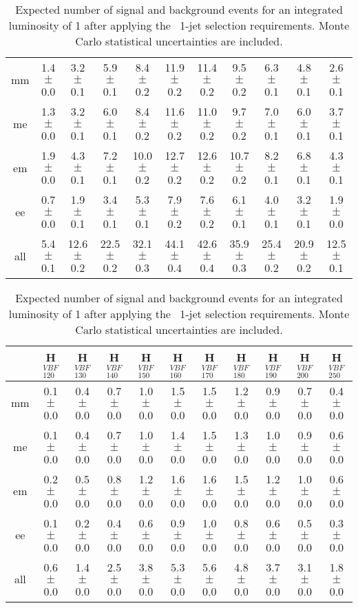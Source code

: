 \begin{table}[!ht]
\begin{center}
{\begin{tabular} {|c|c|c|c|c|c|c|c|c|c|c|}
  mm &  1.4$\pm$0.0 &  3.2$\pm$0.1 &  5.9$\pm$0.1 &  8.4$\pm$0.2 & 11.9$\pm$0.2 & 11.4$\pm$0.2 &  9.5$\pm$0.2 &  6.3$\pm$0.1 &  4.8$\pm$0.1 &  2.6$\pm$0.1 \\
  me &  1.3$\pm$0.0 &  3.2$\pm$0.1 &  6.0$\pm$0.1 &  8.4$\pm$0.2 & 11.6$\pm$0.2 & 11.0$\pm$0.2 &  9.7$\pm$0.2 &  7.0$\pm$0.1 &  6.0$\pm$0.1 &  3.7$\pm$0.1 \\
  em &  1.9$\pm$0.0 &  4.3$\pm$0.1 &  7.2$\pm$0.1 & 10.0$\pm$0.2 & 12.7$\pm$0.2 & 12.6$\pm$0.2 & 10.7$\pm$0.2 &  8.2$\pm$0.1 &  6.8$\pm$0.1 &  4.3$\pm$0.1 \\
  ee &  0.7$\pm$0.0 &  1.9$\pm$0.1 &  3.4$\pm$0.1 &  5.3$\pm$0.1 &  7.9$\pm$0.2 &  7.6$\pm$0.2 &  6.1$\pm$0.1 &  4.0$\pm$0.1 &  3.2$\pm$0.1 &  1.9$\pm$0.0 \\
  \hline
  all &  5.4$\pm$0.1 & 12.6$\pm$0.2 & 22.5$\pm$0.2 & 32.1$\pm$0.3 & 44.1$\pm$0.4 & 42.6$\pm$0.4 & 35.9$\pm$0.3 & 25.4$\pm$0.2 & 20.9$\pm$0.2 & 12.5$\pm$0.1 \\

 \hline
  \end{tabular}
  }
 {\small
  \begin{tabular} {|c|c|c|c|c|c|c|c|c|c|c|}
  \hline
     &   H$^{VBF}_{120}$ &  H$^{VBF}_{130}$ &    H$^{VBF}_{140}$ &   H$^{VBF}_{150}$ &   H$^{VBF}_{160}$ &   H$^{VBF}_{170}$ &   H$^{VBF}_{180}$ &   H$^{VBF}_{190}$ &   H$^{VBF}_{200}$ &   H$^{VBF}_{250}$ \\
  \hline
  \hline
  mm &  0.1$\pm$0.0 &  0.4$\pm$0.0 &  0.7$\pm$0.0 &  1.0$\pm$0.0 &  1.5$\pm$0.0 &  1.5$\pm$0.0 &  1.2$\pm$0.0 &  0.9$\pm$0.0 &  0.7$\pm$0.0 &  0.4$\pm$0.0 \\
  me &  0.1$\pm$0.0 &  0.4$\pm$0.0 &  0.7$\pm$0.0 &  1.0$\pm$0.0 &  1.4$\pm$0.0 &  1.5$\pm$0.0 &  1.3$\pm$0.0 &  1.0$\pm$0.0 &  0.9$\pm$0.0 &  0.6$\pm$0.0 \\
  em &  0.2$\pm$0.0 &  0.5$\pm$0.0 &  0.8$\pm$0.0 &  1.2$\pm$0.0 &  1.6$\pm$0.0 &  1.6$\pm$0.0 &  1.5$\pm$0.0 &  1.2$\pm$0.0 &  1.0$\pm$0.0 &  0.6$\pm$0.0 \\
  ee &  0.1$\pm$0.0 &  0.2$\pm$0.0 &  0.4$\pm$0.0 &  0.6$\pm$0.0 &  0.9$\pm$0.0 &  1.0$\pm$0.0 &  0.8$\pm$0.0 &  0.6$\pm$0.0 &  0.5$\pm$0.0 &  0.3$\pm$0.0 \\
  \hline
 all &  0.6$\pm$0.0 &  1.4$\pm$0.0 &  2.5$\pm$0.0 &  3.8$\pm$0.0 &  5.3$\pm$0.0 &  5.6$\pm$0.0 &  4.8$\pm$0.0 &  3.7$\pm$0.0 &  3.1$\pm$0.0 &  1.8$\pm$0.0 \\


 \hline
  \end{tabular}
  }
  \caption{Expected number of signal and background events for an 
  integrated luminosity of 1\ifb{} after 
  applying the \ww\ 1-jet selection requirements. Monte Carlo statistical uncertainties are 
  included.}
   \label{tab:wwselection1}
  \end{center}
\end{table}



